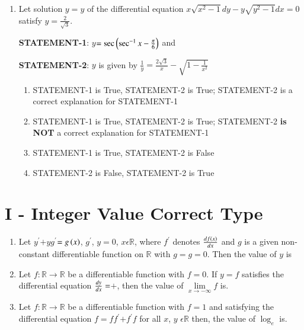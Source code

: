 \documentclass[journal]{IEEEtran}
\begin{document}
\begin{enumerate}
\item Let solution $y=y$ of the differential equation $x\sqrt{x^2-1}dy-y\sqrt{y^2-1}dx=0$ satisfy $y$$=\frac{2}{\sqrt3}$.

	\textbf{STATEMENT-1}: $y$$=\sec{\ensuremath{\left(\sec^{-1}{x}-\frac{\pi}{6}\right)}}$ and 

\textbf{STATEMENT-2}: $y$ is given by $\frac{1}{y}=\frac{2\sqrt3}{x}-\sqrt{1-\frac{1}{x^2}}$ 
\hfill{}
\begin{enumerate}
\item STATEMENT-1 is True, STATEMENT-2 is True; STATEMENT-2 is a correct explanation for STATEMENT-1
\item STATEMENT-1 is True, STATEMENT-2 is True; STATEMENT-2 \textbf{is NOT} a correct explanation for STATEMENT-1
\item STATEMENT-1 is True, STATEMENT-2 is False
\item STATEMENT-2 is False, STATEMENT-2 is True
\end{enumerate}
\end{enumerate}

\section{I - Integer Value Correct Type}

\begin{enumerate}
	\item Let $y^{\prime}$$+y$$g^{\prime}$$=g\left(x\right)$, $g^{\prime}$, $y$$=0$, $x\epsilon\mathbb{R}$, where $f^{\prime}$ denotes $\frac{d{{f\left(x\right)}}}{d{x}}$ and $g$ is a given non-constant differentiable function on $\mathbb{R}$ with $g$$=g$$=0$. Then the value of $y$ is 
		\hfill{}

\item Let $f:\mathbb{R}\to\mathbb{R}$ be a differentiable function with $f$$=0$. If $y=f$ satisfies the differential equation $\frac{d{y}}{d{x}}=$$+$, then the value of $\lim\limits_{x\to-\infty}f$ is. 

	\hfill{}

	\item Let $f:\mathbb{R}\to\mathbb{R}$ be a differentiable function with $f$$=1$ and satisfying the differential equation $f$$=f$$f^{\prime}$$+f^{\prime}$$f$ for all $x$, $y$ $\epsilon \mathbb{R}$ then, the value of $\log_e$  is. 
		\hfill{}

\end{enumerate}
\end{document}
